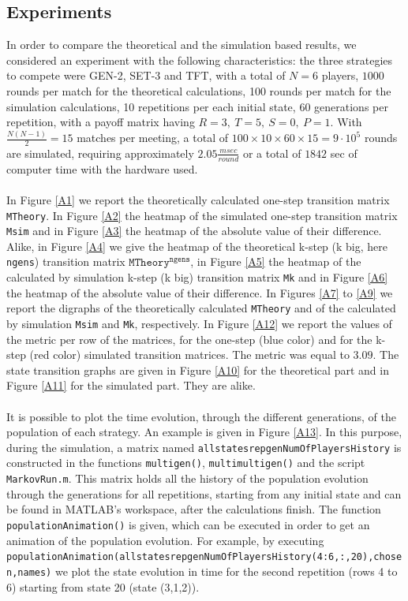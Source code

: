 \documentclass[12pt]{report}
\begin{document}
\subsection{Experiments}
In order to compare the theoretical and the simulation based results, we considered an experiment with the following characteristics: the three strategies to compete were GEN-2, SET-3 and TFT, with a total of $N=6$ players, $1000$ rounds per match for the theoretical calculations, 100 rounds per match for the simulation calculations, 10 repetitions per each initial state, 60 generations per repetition, with a payoff matrix having $R=3,\ T=5,\ S=0,\ P=1$. With $\frac{N(N-1)}{2}=15$ matches per meeting, a total of $100\times10\times60\times15=9\cdot10^5$ rounds are simulated, requiring approximately $2.05 \frac{msec}{round}$ or a total of $1842$ sec of computer time with the hardware used.
\\\\
In Figure \ref{A1} we report the theoretically calculated one-step transition matrix \texttt{MTheory}. In Figure \ref{A2} the heatmap of the simulated one-step transition matrix \texttt{Msim} and in Figure \ref{A3} the heatmap of the absolute value of their difference. Alike, in Figure \ref{A4} we give the heatmap of the theoretical k-step (k big, here \texttt{ngens}) transition matrix $\texttt{MTheory}^{\texttt{ngens}}$, in Figure \ref{A5} the heatmap of the calculated by simulation k-step (k big) transition matrix \texttt{Mk} and in Figure \ref{A6} the heatmap of the absolute value of their difference. In Figures \ref{A7} to \ref{A9} we report the digraphs of the theoretically calculated \texttt{MTheory} and of the calculated by simulation \texttt{Msim} and \texttt{Mk}, respectively. In Figure \ref{A12} we report the values of the metric per row of the matrices, for the one-step (blue color) and for the k-step (red color) simulated transition matrices. The metric was equal to $3.09$. The state transition graphs are given in Figure \ref{A10} for the theoretical part and in Figure \ref{A11} for the simulated part. They are alike.
\\\\
It is possible to plot the time evolution, through the different generations, of the population of each strategy. An example is given in Figure \ref{A13}. In this purpose, during the simulation, a matrix named \texttt{allstatesrepgenNumOfPlayersHistory} is constructed in the functions \texttt{multigen()}, \texttt{multimultigen()} and the script \texttt{MarkovRun.m}. This matrix holds all the history of the population evolution through the generations for all repetitions, starting from any initial state and can be found in MATLAB's workspace, after the calculations finish. The function \texttt{populationAnimation()} is given, which can be executed in order to get an animation of the population evolution. For example, by executing \texttt{populationAnimation(allstatesrepgenNumOfPlayersHistory(4:6,:,20),chosen,names)} we plot the state evolution in time for the second repetition (rows 4 to 6) starting from state 20 (state (3,1,2)).
\end{document}
